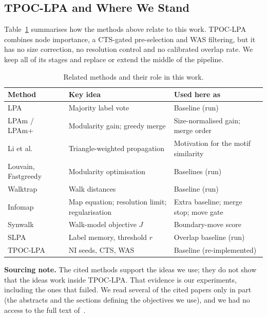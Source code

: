 \documentclass[conference]{IEEEtran}
\begin{document}
\subsection{TPOC-LPA and Where We Stand}
Table~\ref{tab:related} summarises how the methods above relate to this work. TPOC-LPA~\cite{kong2026} combines node importance, a CTS-gated pre-selection and WAS filtering, but it has no size correction, no resolution control and no calibrated overlap rate. We keep all of its stages and replace or extend the middle of the pipeline.
\begin{table}[!t]
\centering
\caption{Related methods and their role in this work.}
\label{tab:related}
\scriptsize
\begin{tabular}{>{\raggedright\arraybackslash}p{19mm}>{\raggedright\arraybackslash}p{26mm}>{\raggedright\arraybackslash}p{29mm}}
\toprule
Method & Key idea & Used here as \\
\midrule
LPA~\cite{raghavan2007} & Majority label vote & Baseline (run) \\
LPAm / LPAm+~\cite{barber2009,liu2010} & Modularity gain; greedy merge & Size-normalised gain; merge order \\
Li et al.~\cite{li2020motif} & Triangle-weighted propagation & Motivation for the motif similarity \\
Louvain, Fastgreedy~\cite{blondel2008,clauset2004} & Modularity optimisation & Baselines (run) \\
Walktrap~\cite{pons2006} & Walk distances & Baseline (run) \\
Infomap~\cite{rosvall2008,kawamoto2015,smiljanic2020} & Map equation; resolution limit; regularisation & Extra baseline; merge stop; move gate \\
Synwalk~\cite{toth2022} & Walk-model objective $J$ & Boundary-move score \\
SLPA~\cite{xie2011} & Label memory, threshold $r$ & Overlap baseline (run) \\
TPOC-LPA~\cite{kong2026} & NI seeds, CTS, WAS & Baseline (re-implemented) \\
\bottomrule
\end{tabular}
\end{table}

\textbf{Sourcing note.} The cited methods support the ideas we use; they do not show that the ideas work inside TPOC-LPA. That evidence is our experiments, including the ones that failed. We read several of the cited papers only in part (the abstracts and the sections defining the objectives we use), and we had no access to the full text of~\cite{li2020motif}.
\end{document}
